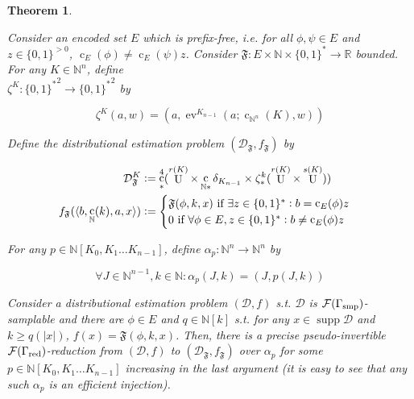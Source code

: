 \documentclass[11pt]{article}
\numberwithin{equation}{section}
\theoremstyle{definition}
\theoremstyle{plain}
\newtheorem{theorem}{Theorem}[section]
\newcommand{\Bool}{\{0,1\}}
\newcommand{\Words}{{\Bool^*}}
\DeclareMathOperator{\Supp}{supp}
\DeclareMathOperator{\Ev}{ev}
\DeclareMathOperator{\Un}{U}
\DeclareMathOperator{\En}{c}
\newcommand{\Nats}{\mathbb{N}}
\newcommand{\Reals}{\mathbb{R}}
\newcommand{\NatPoly}{\Nats[K_0, K_1 \ldots K_{n-1}]}
\newcommand{\NatFun}{\Nats^n \rightarrow}
\newcommand{\Abs}[1]{\lvert #1 \rvert}
\newcommand{\Chev}[1]{\langle #1 \rangle}
\newcommand{\Dist}{\mathcal{D}}
\newcommand{\Fall}{\mathcal{F}}
\begin{document}
\begin{samepage}
\begin{theorem}
\label{thm:complete}

Consider an encoded set ${E}$ which is prefix-free, i.e. for all ${\phi,\psi \in E}$ and ${z \in \Bool^{>0}}$, ${\En_E(\phi) \ne \En_E(\psi)z}$. Consider ${\mathfrak{F}: E \times \Nats \times \Words \rightarrow \Reals}$ bounded. For any ${K \in \Nats^n}$, define\\ $\zeta^K: \Words^2 \rightarrow \Words^2$ by 

\begin{equation}
\zeta^K(a,w)=(a,\Ev^{K_{n-1}}(a;\En_{\Nats^n}(K),w))
\end{equation}

Define the distributional estimation problem $({\Dist_{\mathfrak{F}}},f_{\mathfrak{F}})$ by 

\begin{align}
\Dist_{\mathfrak{F}}^K&:=\En_*^4 (\Un^{r(K)} \times \En_{\Nats*} \delta_{K_{n-1}} \times \zeta_*^k(\Un^{r(K)} \times \Un^{s(K)})) \\
f_{\mathfrak{F}}(\Chev{b,\En_\Nats(k),a,x}) &:= \begin{cases}\mathfrak{F}(\phi,k,x) \textnormal{ if } \exists z \in \Words: b=\En_E(\phi)z \\ 0 \textnormal{ if } \forall \phi \in E, z \in \Words: b \ne \En_E(\phi)z\end{cases}
\end{align}

For any ${p \in \NatPoly}$, define ${\alpha_p: \NatFun \Nats^n}$ by

\begin{equation}
\forall J \in \Nats^{n-1}, k \in \Nats: \alpha_p(J,k) = (J,p(J,k))
\end{equation}

Consider a distributional estimation problem ${(\Dist,f)}$ s.t. ${\Dist}$ is ${\Fall(\Gamma_{\textnormal{smp}})}$-samplable and there are ${\phi \in E}$ and ${q \in \Nats[k]}$ s.t. for any ${x \in \Supp \Dist}$ and ${k \geq q(\Abs{x})}$, ${f(x)=\mathfrak{F}(\phi,k,x)}$. Then, there is a precise pseudo-invertible ${\Fall(\Gamma_{\textnormal{red}})}$-reduction from ${(\Dist,f)}$ to ${(\Dist_{\mathfrak{F}}, f_{\mathfrak{F}})}$ over ${\alpha_p}$ for some\\ $p \in \NatPoly$ increasing in the last argument (it is easy to see that any such ${\alpha_p}$ is an efficient injection).

\end{theorem}
\end{samepage}
\end{document}
